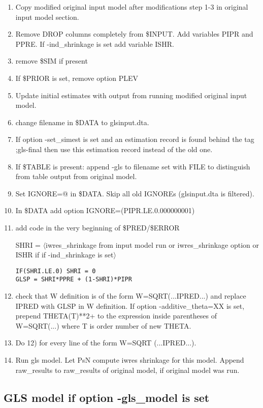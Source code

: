 \documentclass[a4paper,12pt]{article}
\begin{document}
\begin{enumerate}
\item Copy modified original input model after modifications step 1-3 in original input model section.
\item Remove DROP columns completely from \$INPUT. Add variables PIPR and PPRE. If -ind\_shrinkage is set add variable ISHR. 
\item remove \$SIM if present
\item If \$PRIOR is set, remove option PLEV
\item Update initial estimates with output from running modified original input model.
\item change filename in \$DATA to glsinput.dta.
\item If option -set\_simest is set and an estimation record is found behind the tag ;gls-final then use this estimation record instead of the old one.
\item If \$TABLE is present: append -gls to filename set with FILE to distinguish from table output from original model.
\item Set IGNORE=@ in \$DATA. Skip all old IGNOREs (glsinput.dta is filtered). 
\item In \$DATA add option IGNORE=(PIPR.LE.0.000000001)
\item add code in the very beginning of \$PRED/\$ERROR  

SHRI = $\langle$iwres\_shrinkage from input model run or iwres\_shrinkage option or ISHR if if -ind\_shrinkage is set$\rangle$ 
\begin{verbatim}
IF(SHRI.LE.0) SHRI = 0
GLSP = SHRI*PPRE + (1-SHRI)*PIPR
\end{verbatim}
\item check that W definition is of the form W=SQRT(...IPRED...) and replace IPRED with GLSP in W definition. If option -additive\_theta=XX is set, prepend THETA(T)**2+  to the expression inside parentheses of W=SQRT(...)  where T is order number of new THETA.
\item Do 12) for every line of the form W=SQRT (...IPRED...).
\item Run gls model. Let PsN compute iwres shrinkage for this model. Append raw\_results to raw\_results of original model, if original model was run.
\end{enumerate}

\subsection{GLS model if option -gls\_model is set}
\end{document}
